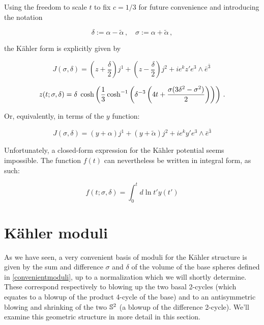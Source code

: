 Using the freedom to scale $t$ to fix $c=1/3$ for future convenience and introducing the notation 

\begin{equation}\label{convenientmoduli}
	\delta := \alpha - \tilde{\alpha}\,,\quad \sigma := \alpha + \tilde{\alpha}\,,
\end{equation}

the K\"ahler form is explicitly given by

\begin{equation}
	J(\sigma,\delta) = \left(  z + \frac{\delta}{2}\right) j^1 + \left(z-\frac{\delta}{2}\right) j^2 + ie^k z' e^3 \wedge \bar e^{\bar 3}\,
	\label{}
\end{equation}

\begin{equation}
	z(t;\sigma,\delta) = \delta \;\cosh \left( \frac{1}{3} \cosh^{-1} \left(  \delta^{-3} \left( 4t + \frac{\sigma(3\delta^2 - \sigma^2)}{2} \right)  \right) \right) \,.
	\label{}
\end{equation}

Or, equivalently, in terms of the $y$ function:

\begin{equation}
	J(\sigma,\delta) = (y+\alpha) j^1 + (y+\tilde{\alpha})j^2 + ie^k y' e^3 \wedge \bar e^{\bar 3}
	\label{}
\end{equation}

Unfortunately, a closed-form expression for the K\"ahler potential seems impossible. The function $f(t)$ can nevertheless be written in integral form, as such:

\begin{equation}
	f(t;\sigma,\delta) = \int_0^{t} d\ln t' y(t')
	\label{}
\end{equation}

\section{K\"ahler moduli}

As we have seen, a very convenient basis of moduli for the K\"ahler structure is given by the sum and difference $\sigma$ and $\delta$ of the volume of the base spheres defined in \eqref{convenientmoduli}, up to a normalization which we will shortly determine. These correspond respectively to blowing up the two basal 2-cycles (which equates to a blowup of the product 4-cycle of the base) and to an antisymmetric blowing and shrinking of the two $\mathbb{S}^2$ (a blowup of the difference 2-cycle). We'll examine this geometric structure in more detail in this section.

